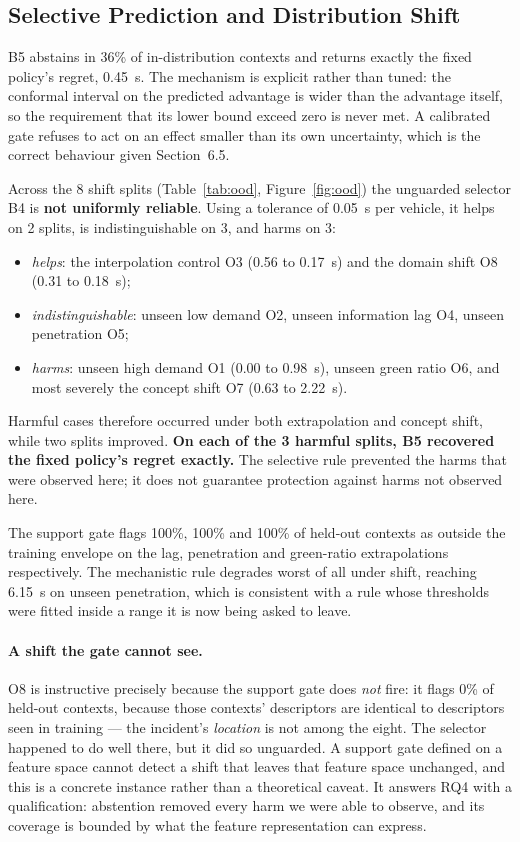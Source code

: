 \documentclass[runningheads]{llncs}
\begin{document}
\subsection{Selective Prediction and Distribution Shift}

B5 abstains in 36\% of in-distribution contexts and returns exactly
the fixed policy's regret, 0.45~s. The mechanism is explicit rather
than tuned: the conformal interval on the predicted advantage is wider than the
advantage itself, so the requirement that its lower bound exceed zero is never
met. A calibrated gate refuses to act on an effect smaller than its own
uncertainty, which is the correct behaviour given Section~6.5.

Across the 8 shift splits (Table~\ref{tab:ood},
Figure~\ref{fig:ood}) the unguarded selector B4 is \textbf{not uniformly
reliable}. Using a tolerance of 0.05~s per vehicle, it helps on
2 splits, is indistinguishable on 3, and harms on
3:
\begin{itemize}
\item \emph{helps}: the interpolation control O3 (0.56 to
0.17~s) and the domain shift O8 (0.31 to
0.18~s);
\item \emph{indistinguishable}: unseen low demand O2, unseen information lag
O4, unseen penetration O5;
\item \emph{harms}: unseen high demand O1 (0.00 to
0.98~s), unseen green ratio O6, and most severely the concept
shift O7 (0.63 to 2.22~s).
\end{itemize}
Harmful cases therefore occurred under both extrapolation and concept shift,
while two splits improved. \textbf{On each of the 3 harmful splits,
B5 recovered the fixed policy's regret exactly.} The selective rule prevented
the harms that were observed here; it does not guarantee protection against
harms not observed here.

The support gate flags 100\%, 100\% and
100\% of held-out contexts as outside the training envelope
on the lag, penetration and green-ratio extrapolations respectively. The
mechanistic rule degrades worst of all under shift, reaching
6.15~s on unseen penetration, which is consistent with a rule
whose thresholds were fitted inside a range it is now being asked to leave.

\paragraph{A shift the gate cannot see.} O8 is instructive precisely because the
support gate does \emph{not} fire: it flags 0\% of
held-out contexts, because those contexts' descriptors are identical to
descriptors seen in training --- the incident's \emph{location} is not among the
eight. The selector happened to do well there, but it did so unguarded. A
support gate defined on a feature space cannot detect a shift that leaves that
feature space unchanged, and this is a concrete instance rather than a
theoretical caveat. It answers RQ4 with a qualification: abstention removed
every harm we were able to observe, and its coverage is bounded by what the
feature representation can express.
\end{document}
